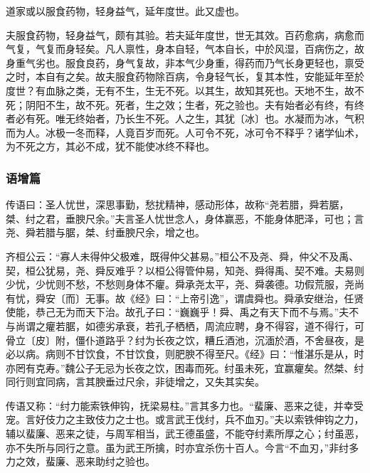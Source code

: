 \documentclass[]{article}
\begin{document}
道家或以服食药物，轻身益气，延年度世。此又虚也。

夫服食药物，轻身益气，颇有其验。若夫延年度世，世无其效。百药愈病，病愈而气复，气复而身轻矣。凡人禀性，身本自轻，气本自长，中於风湿，百病伤之，故身重气劣也。服食良药，身气复故，非本气少身重，得药而乃气长身更轻也，禀受之时，本自有之矣。故夫服食药物除百病，令身轻气长，复其本性，安能延年至於度世？有血脉之类，无有不生，生无不死。以其生，故知其死也。天地不生，故不死；阴阳不生，故不死。死者，生之效；生者，死之验也。夫有始者必有终，有终者必有死。唯无终始者，乃长生不死。人之生，其犹〔冰〕也。水凝而为冰，气积而为人。冰极一冬而释，人竟百岁而死。人可令不死，冰可令不释乎？诸学仙术，为不死之方，其必不成，犹不能使冰终不释也。

\hypertarget{header-n287}{%
\subsubsection{语增篇}\label{header-n287}}

传语曰：圣人忧世，深思事勤，愁扰精神，感动形体，故称``尧若腊，舜若腒，桀、纣之君，垂腴尺余。''夫言圣人忧世念人，身体赢恶，不能身体肥泽，可也；言尧、舜若腊与腒，桀、纣垂腴尺余，增之也。

齐桓公云：``寡人未得仲父极难，既得仲父甚易。''桓公不及尧、舜，仲父不及禹、契，桓公犹易，尧、舜反难乎？以桓公得管仲易，知尧、舜得禹、契不难。夫易则少忧，少忧则不愁，不愁则身体不癯。舜承尧太平，尧、舜袭德。功假荒服，尧尚有忧，舜安〔而〕无事。故《经》曰：``上帝引逸''，谓虞舜也。舜承安继治，任贤使能，恭己无为而天下治。故孔子曰：``巍巍乎！舜、禹之有天下而不与焉。''夫不与尚谓之癯若腒，如德劣承衰，若孔子栖栖，周流应聘，身不得容，道不得行，可骨立〔皮〕附，僵仆道路乎？纣为长夜之饮，糟丘酒池，沉湎於酒，不舍昼夜，是必以病。病则不甘饮食，不甘饮食，则肥腴不得至尺。《经》曰：``惟湛乐是从，时亦罔有克寿。''魏公子无忌为长夜之饮，困毒而死。纣虽未死，宜赢癯矣。然桀、纣同行则宜同病，言其腴垂过尺余，非徒增之，又失其实矣。

传语又称：``纣力能索铁伸钩，抚梁易柱。''言其多力也。``蜚廉、恶来之徒，并幸受宠。言好伎力之主致伎力之士也。或言武王伐纣，兵不血刃。''夫以索铁伸钩之力，辅以蜚廉、恶来之徒，与周军相当，武王德虽盛，不能夺纣素所厚之心；纣虽恶，亦不失所与同行之意。虽为武王所擒，时亦宜杀伤十百人。今言``不血刃，''非纣多力之效，蜚廉、恶来助纣之验也。
\end{document}
